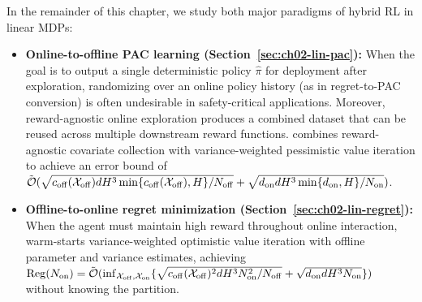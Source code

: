 In the remainder of this chapter, we study both major paradigms of hybrid RL in linear MDPs:
\begin{itemize}
    \item \textbf{Online-to-offline PAC learning (Section~\ref{sec:ch02-lin-pac}):} When the goal is to output a single deterministic policy $\widehat{\pi}$ for deployment after exploration, randomizing over an online policy history (as in regret-to-PAC conversion) is often undesirable in safety-critical applications. Moreover, reward-agnostic online exploration produces a combined dataset that can be reused across multiple downstream reward functions.  combines reward-agnostic covariate collection \citep{wagenmaker2022instance} with variance-weighted pessimistic value iteration \citep{xiong2023nearly} to achieve an error bound of $\tilde{{\mathcal{O}}}(\sqrt{c_{{\operatorname{off}}}({\mathcal{X}}_{{\operatorname{off}}}) d H^3 \min\{c_{{\operatorname{off}}}({\mathcal{X}}_{{\operatorname{off}}}), H\} / N_{{\operatorname{off}}}} + \sqrt{d_{{\operatorname{on}}} d H^3 \min\{d_{{\operatorname{on}}}, H\} / N_{{\operatorname{on}}}})$.
    \item \textbf{Offline-to-online regret minimization (Section~\ref{sec:ch02-lin-regret}):} When the agent must maintain high reward throughout online interaction,  warm-starts variance-weighted optimistic value iteration \citep{he2023nearly} with offline parameter and variance estimates, achieving $\operatorname{Reg}(N_{{\operatorname{on}}}) = \tilde{{\mathcal{O}}}(\inf_{{\mathcal{X}}_{{\operatorname{off}}}, {\mathcal{X}}_{{\operatorname{on}}}}\{\sqrt{c_{{\operatorname{off}}}({\mathcal{X}}_{{\operatorname{off}}})^2 d H^3 N_{{\operatorname{on}}}^2 / N_{{\operatorname{off}}}} + \sqrt{d_{{\operatorname{on}}} d H^3 N_{{\operatorname{on}}}}\})$ without knowing the partition.
\end{itemize}

